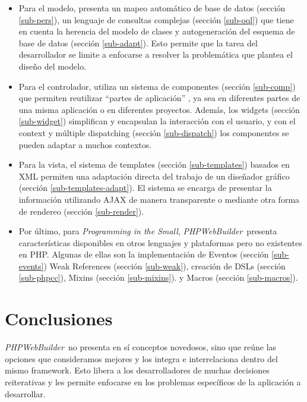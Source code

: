 \documentclass[a4paper,10pt]{article}
\newcommand{\PITS}{\emph{Programming in the Small}} %
\newcommand{\PWB}{\emph{PHPWebBuilder}}
\begin{document}
\begin{itemize}
\item Para el modelo, presenta un mapeo automático de base de datos (sección \ref{sub-pers}), un lenguaje de consultas complejas (sección \ref{sub-oql}) que tiene en cuenta la herencia del modelo de clases y autogeneración del esquema de base de datos (sección \ref{sub-adapt}). Esto permite que la tarea del desarrollador se limite a enfocarse a resolver la problemática que plantea el diseño del modelo.

\item Para el controlador, utiliza un sistema de componentes (sección \ref{sub-comp}) que permiten reutilizar ``partes de aplicación'' , ya sea en diferentes partes de una misma aplicación o en diferentes proyectos. Además, los widgets (sección \ref{sub-widget}) simplifican y encapsulan la interacción con el usuario, y con el context y múltiple dispatching (sección \ref{sub-dispatch}) los componentes se pueden adaptar a muchos contextos.

\item Para la vista, el sistema de templates (sección \ref{sub-templates}) basados en XML permiten una adaptación directa del trabajo de un diseñador gráfico (sección \ref{sub-templates-adapt}). El sistema se encarga de presentar la información utilizando AJAX de manera transparente o mediante otra forma de rendereo (sección \ref{sub-render}).

\item Por último, para \PITS, \PWB \ presenta características disponibles en otros lenguajes y plataformas pero no existentes en PHP. Algunas de ellas son la implementación de Eventos (sección \ref{sub-events})
Weak References (sección \ref{sub-weak}),
creación de DSLs (sección \ref{sub-phpcc}),
Mixins (sección \ref{sub-mixins}).
y Macros (sección \ref{sub-macros}).

\end{itemize}





\section{Conclusiones}

\PWB\ no presenta en sí conceptos novedosos, sino que reúne las opciones que consideramos mejores y los integra e interrelaciona dentro del mismo framework. Esto libera a los desarrolladores de muchas decisiones reiterativas y les permite enfocarse en los problemas específicos de la aplicación a desarrollar.
\end{document}
